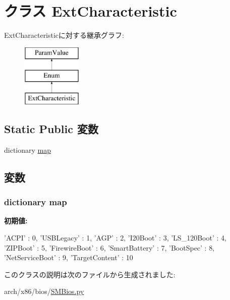 \hypertarget{classSMBios_1_1ExtCharacteristic}{
\section{クラス ExtCharacteristic}
\label{classSMBios_1_1ExtCharacteristic}
}
ExtCharacteristicに対する継承グラフ:\begin{figure}[H]
\begin{center}
\leavevmode
\includegraphics[height=3cm]{classSMBios_1_1ExtCharacteristic}
\end{center}
\end{figure}
\subsection*{Static Public 変数}
\begin{DoxyCompactItemize}
\item 
dictionary \hyperlink{classSMBios_1_1ExtCharacteristic_aca70ca58dda85cf4fe7a0737ec18e004}{map}
\end{DoxyCompactItemize}


\subsection{変数}
\hypertarget{classSMBios_1_1ExtCharacteristic_aca70ca58dda85cf4fe7a0737ec18e004}{
\subsubsection[{map}]{\setlength{\rightskip}{0pt plus 5cm}dictionary {\bf map}}}
\label{classSMBios_1_1ExtCharacteristic_aca70ca58dda85cf4fe7a0737ec18e004}
{\bfseries 初期値:}
\begin{DoxyCode}
{'ACPI' : 0,
           'USBLegacy' : 1,
           'AGP' : 2,
           'I20Boot' : 3,
           'LS_120Boot' : 4,
           'ZIPBoot' : 5,
           'FirewireBoot' : 6,
           'SmartBattery' : 7,
           'BootSpec' : 8,
           'NetServiceBoot' : 9,
           'TargetContent' : 10
    }
\end{DoxyCode}


このクラスの説明は次のファイルから生成されました:\begin{DoxyCompactItemize}
\item 
arch/x86/bios/\hyperlink{SMBios_8py}{SMBios.py}\end{DoxyCompactItemize}
